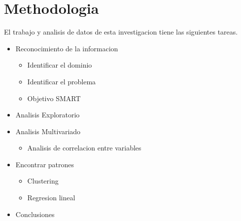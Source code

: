 \section{Methodologia}
 El trabajo y analisis de datos de esta investigacion tiene las siguientes tareas.
 \begin{itemize}
  \item Reconocimiento de la informacion 
  \begin{itemize}
   \item Identificar el dominio
   \item Identificar el problema
   \item Objetivo SMART 
  \end{itemize}
  \item Analisis Exploratorio
  \item Analisis Multivariado
  \begin{itemize}
	\item Analisis de correlacion entre variables
  \end{itemize}
  \item Encontrar patrones
   \begin{itemize}
    \item Clustering
    \item Regresion lineal
   \end{itemize}  
  \item Conclusiones
 \end{itemize}
